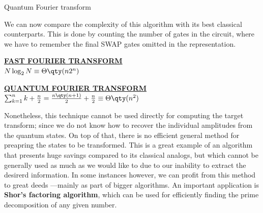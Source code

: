 \begin{frame}[allowframebreaks]{Quantum Fourier transform}
\break

	We can now compare the complexity of this algorithm with its best classical counterparts. This is done by counting the number of gates in the circuit, where we have to remember the final SWAP gates omitted in the representation.

	\begin{multicols}{2}
	\begin{centering}

		\underline{\textbf{FAST FOURIER TRANSFORM}}\\
		\medskip
		$N\log_2 N \equiv \Theta\qty(n2^n)$

		\columnbreak

		\underline{\textbf{QUANTUM FOURIER TRANSFORM}}\\
		\medskip
		$\sum_{k=1}^{n}k + \frac{n}{2} =
			\frac{n\qty(n+1)}{2} + \frac{n}{2} \equiv \Theta\qty(n^2)$

	\end{centering}
	\end{multicols}

	Nonetheless, this technique cannot be used directly for computing the target transform; since we do not know how to recover the individual amplitudes from the quantum states. On top of that, there is no efficient general method for preapring the states to be transformed. This is a great example of an algorithm that presents huge savings compared to its classical analogs, but which cannot be generally used as much as we would like to due to our inability to extract the desirerd information. In some instances however, we can profit from this method to great deeds ---mainly as part of bigger algorithms. An important application is \textbf{Shor's factoring algorithm}, which can be used for efficiently finding the prime decomposition of any given number.

\end{frame}
